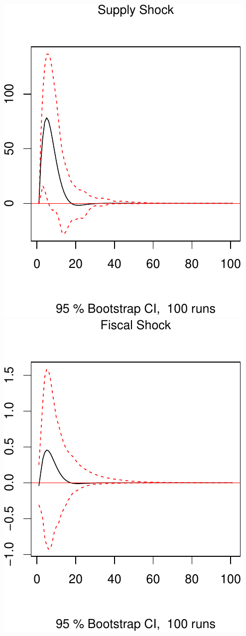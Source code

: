 \documentclass[11pt,preprint, authoryear]{elsarticle}
\numberwithin{equation}{section}
\numberwithin{figure}{section}
\numberwithin{table}{section}
\begin{document}
\includegraphics{TS_proj_files/figure-latex/unnamed-chunk-46-1.pdf}
\includegraphics{TS_proj_files/figure-latex/unnamed-chunk-46-2.pdf}
\end{document}
